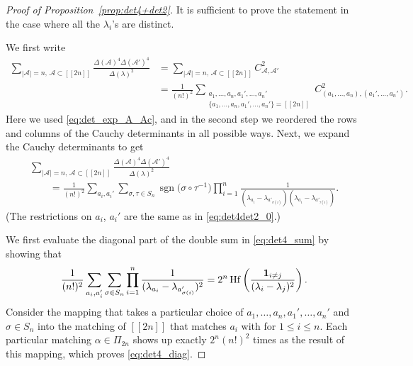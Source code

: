 \documentclass[pdftex]{sigma}
\numberwithin{equation}{section}
\theoremstyle{definition}
\newcommand{\ind}{{\bf{1}}}
\newcommand{\sgn}{\operatorname{sgn}}
\newcommand{\Hf}{\operatorname{Hf}}
\newcommand{\cA}{\mathcal{A}}
\newcommand{\lst}[1]{[\![#1 ]\!]}
\begin{document}
\begin{proof}[Proof of Proposition~\ref{prop:det4+det2}]
It is sufficient to prove the statement in the case where all the $\lambda_i$'s are distinct.

We first write
\begin{align}
\sum_{|\cA|=n,\, \cA\subset\lst{2n}} \frac{\Delta(\cA)^4 \Delta(\cA')^4}{ \Delta(\lambda)^2}& =
\sum_{|\cA|=n, \,\cA\subset\lst{2n}} C_{\cA, \cA'}^2\nonumber
\\
&=\frac{1}{(n!)^2} \sum_{\substack{a_1,\dots, a_n, a_1', \dots, a_n'\\\{a_1,\dots, a_n, a_1', \dots, a_n'\}=\lst{2n}}} C_{(a_1,\dots,a_n), (a_1', \dots, a_n')}^2. \label{eq:det4det2_0}
\end{align}
Here we used \eqref{eq:det_exp_A_Ac}, and in the second step we reordered the rows and columns of the Cauchy determinants in all possible ways.
 Next,
we expand the Cauchy determinants to get
\begin{gather}
 \sum_{|\cA|=n,\, \cA\subset\lst{2n}} \frac{
 \Delta
 (\cA)^4 \Delta
 (\cA')^4}{ \Delta
 (\lambda)^2}\nonumber\\
 \qquad=\frac{1}{(n!)^2}\sum_{a_i, a_i'} \sum_{\sigma, \tau\in S_n} \sgn\bigl(\sigma\circ \tau^{-1}\bigr)
 \prod_{i=1}^n \frac{1}{(\lambda_{a_i} - \lambda_{a'_{\sigma(i)}})(\lambda_{a_i} - \lambda_{a'_{\tau(i)}})}.\label{eq:det4_sum}
\end{gather}
(The restrictions on $a_i$, $ a_i'$ are the same as in \eqref{eq:det4det2_0}.)

We first evaluate the diagonal part of the double sum in \eqref{eq:det4_sum} by showing that
\begin{align}\label{eq:det4_diag}
\frac{1}{(n!)^2}\sum_{a_i, a_i'} \sum_{\sigma\in S_{n}}
 \prod_{i=1}^n \frac{1}{(\lambda_{a_i} - \lambda_{a'_{\sigma(i)}})^2}=2^n \Hf \left(
 \frac{\ind_{i \neq j }}{(\lambda_i -\lambda_j)^{2}} \right).
\end{align}
Consider the mapping that takes a particular choice of $a_1,\dots, a_n, a_1', \dots, a_n'$ and $\sigma\in S_n$ into the matching of $\lst{2n}$ that matches $a_i$ with  for $1\le i\le n$. Each particular matching $\alpha\in \Pi_{2n}$ shows up exactly $2^n (n!)^2$ times as the result of this mapping, which proves \eqref{eq:det4_diag}.


\end{proof}
\end{document}
